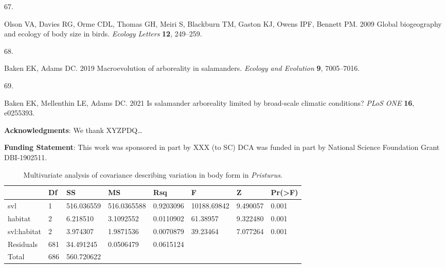 \documentclass[
  11pt,
]{article}
\newlength{\cslhangindent}
\newlength{\csllabelwidth}
\newlength{\cslentryspacingunit} %
\newenvironment{CSLReferences}[2] %
 {%
  \setlength{\parindent}{0pt}
  \ifodd #1
  \let\oldpar\par
  \def\par{\hangindent=\cslhangindent\oldpar}
  \fi
  \setlength{\parskip}{#2\cslentryspacingunit}
 }%
 {}
\newcommand{\CSLLeftMargin}[1]{\parbox[t]{\csllabelwidth}{#1}}
\newcommand{\CSLRightInline}[1]{\parbox[t]{\linewidth - \csllabelwidth}{#1}\break}
\begin{document}
\begin{CSLReferences}{0}{0}
\leavevmode{}%
\CSLLeftMargin{67. }%
\CSLRightInline{Olson VA, Davies RG, Orme CDL, Thomas GH, Meiri S,
Blackburn TM, Gaston KJ, Owens IPF, Bennett PM. 2009 Global biogeography
and ecology of body size in birds. \emph{Ecology Letters} \textbf{12},
249--259.}

\leavevmode{}%
\CSLLeftMargin{68. }%
\CSLRightInline{Baken EK, Adams DC. 2019 Macroevolution of arboreality
in salamanders. \emph{Ecology and Evolution} \textbf{9}, 7005--7016.}

\leavevmode{}%
\CSLLeftMargin{69. }%
\CSLRightInline{Baken EK, Mellenthin LE, Adams DC. 2021 Is salamander
arboreality limited by broad-scale climatic conditions? \emph{PLoS ONE}
\textbf{16}, e0255393.}

\end{CSLReferences}

\newpage

\hfill\break

\textbf{Acknowledgments}: We thank XYZPDQ\ldots{}

\textbf{Funding Statement}: This work was sponsored in part by XXX (to
SC) DCA was funded in part by National Science Foundation Grant
DBI-1902511.

\newpage

\begin{table}[H]

\caption{\label{tab:unnamed-chunk-1}Multivariate analysis of covariance describing variation in body form in \textit{Pristurus}.}
\centering
\begin{tabular}[t]{llllllll}
\toprule
  & Df & SS & MS & Rsq & F & Z & Pr(>F)\\
\midrule
svl & 1 & 516.036559 & 516.0365588 & 0.9203096 & 10188.69842 & 9.490057 & 0.001\\
habitat & 2 & 6.218510 & 3.1092552 & 0.0110902 & 61.38957 & 9.322480 & 0.001\\
svl:habitat & 2 & 3.974307 & 1.9871536 & 0.0070879 & 39.23464 & 7.077264 & 0.001\\
Residuals & 681 & 34.491245 & 0.0506479 & 0.0615124 &  &  & \\
Total & 686 & 560.720622 &  &  &  &  & \\
\bottomrule
\end{tabular}
\end{table}

\newpage
\end{document}
